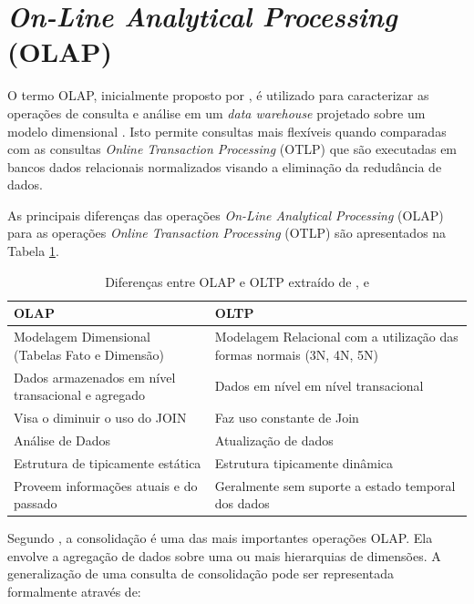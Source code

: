 \section{\textit{On-Line Analytical Processing} (OLAP)}

O termo OLAP, inicialmente proposto por , é utilizado para caracterizar as operações de consulta e análise em um \textit{data warehouse} projetado sobre um modelo dimensional \cite{Kimball2002}. Isto permite consultas mais flexíveis quando comparadas com as consultas \textit{Online Transaction Processing} (OTLP) que são executadas em bancos dados relacionais normalizados  visando a eliminação da redudância de dados.

As principais diferenças das operações \textit{On-Line Analytical Processing} (OLAP) para as operações 
\textit{Online Transaction Processing} (OTLP) são apresentados na Tabela 
\ref{olapxoltp}.

	\begin{table}[!ht]
	\begin{center}
	 \begin{tabular}{|p{5cm}|p{5cm}|}
		\hline
		OLAP & OLTP \\ \hline
		Modelagem Dimensional (Tabelas Fato e Dimensão) & Modelagem Relacional com a utilização das formas normais (3N, 4N, 5N) \\ \hline
		Dados armazenados em nível transacional e agregado    & Dados em nível em nível transacional        \\ \hline
		Visa o diminuir o uso do JOIN & Faz uso constante de Join   \\ \hline
		Análise de Dados & Atualização de dados
		\\ \hline
		Estrutura de tipicamente estática  & Estrutura tipicamente dinâmica      \\ \hline
		Proveem informações atuais e do passado & Geralmente sem suporte a estado temporal dos dados
		      \\ \hline

		\end{tabular}
		\caption{Diferenças entre OLAP e OLTP extraído de ,  e }
		\label{olapxoltp}
		\end{center}
		\end{table}
		\FloatBarrier

Segundo , a consolidação é uma das mais importantes operações OLAP. Ela envolve a agregação de dados sobre uma ou mais hierarquias de dimensões. A generalização de uma consulta de consolidação pode ser representada formalmente através de: 

